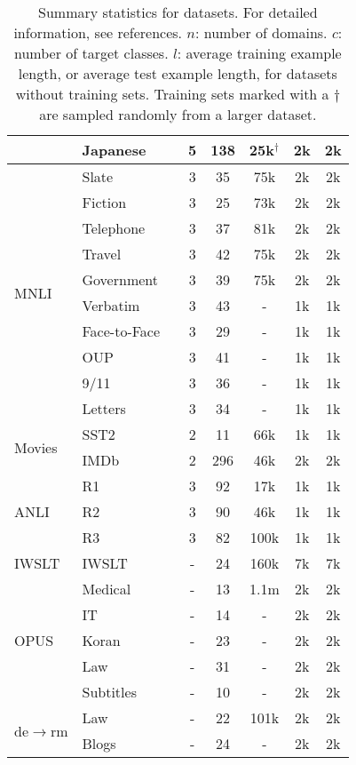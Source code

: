 \begin{table*}[t]
\begin{tabular}{llcccccc}
& Japanese & \citealt{yelp} & 5 & 138 & 25k$^\dagger$ & 2k & 2k\\
\midrule
\multirow{10}{*}{MNLI}
& Slate & \citealt{williams2018broad} & 3 & 35 & 75k & 2k & 2k \\
& Fiction & \citealt{williams2018broad} & 3 & 25 & 73k & 2k & 2k \\
& Telephone & \citealt{williams2018broad} & 3 & 37 & 81k & 2k & 2k \\
& Travel & \citealt{williams2018broad} & 3 & 42 & 75k& 2k & 2k  \\
& Government & \citealt{williams2018broad} & 3 & 39 & 75k & 2k & 2k  \\
& Verbatim & \citealt{williams2018broad} & 3 & 43 & - & 1k & 1k \\
& Face-to-Face & \citealt{williams2018broad} & 3 & 29 & - & 1k & 1k \\
& OUP & \citealt{williams2018broad} & 3 & 41 & - & 1k & 1k \\
& 9/11 & \citealt{williams2018broad} & 3 & 36 & - & 1k & 1k \\
& Letters & \citealt{williams2018broad} & 3 & 34 & - & 1k & 1k \\
\midrule
\multirow{2}{*}{Movies}
& SST2 & \citealt{socher2013recursive} & 2 & 11 & 66k & 1k & 1k\\
& IMDb & \citealt{maas2011learning} & 2 & 296 & 46k & 2k & 2k\\
\midrule
\multirow{3}{*}{ANLI}
& R1 & \citealt{nie2019adversarial} & 3 & 92 & 17k & 1k & 1k \\
& R2 & \citealt{nie2019adversarial} & 3 & 90 & 46k & 1k & 1k \\
& R3 & \citealt{nie2019adversarial} & 3 & 82 & 100k & 1k & 1k \\
\midrule
IWSLT & IWSLT & \citealt{cettolo2014proceedings} & - & 24 & 160k & 7k & 7k \\
\midrule
\multirow{5}{*}{OPUS}
& Medical & \citealt{TIEDEMANN12.463} & - & 13 & 1.1m & 2k & 2k\\
& IT & \citealt{TIEDEMANN12.463} & - & 14 & - & 2k & 2k\\
& Koran & \citealt{TIEDEMANN12.463} & - & 23 & - & 2k & 2k\\
& Law & \citealt{TIEDEMANN12.463} & - & 31 & - & 2k & 2k\\
& Subtitles & \citealt{TIEDEMANN12.463} & - & 10 & - & 2k & 2k\\
\midrule
\multirow{2}{*}{de$\to$rm}
& Law & \citealt{scherrer-cartoni-2012-trilingual} & - & 22 & 101k & 2k & 2k \\
& Blogs & \citealt{Muller2019DomainRI} & - & 24 & - & 2k & 2k \\
\bottomrule
\end{tabular}
\caption{Summary statistics for datasets. For detailed information, see references. $n$: number of domains. $c$: number of target classes. $l$: average training example length, or average test example length, for datasets without training sets. Training sets marked with a $\dagger$ are sampled randomly from a larger dataset.}
\label{tab:data_summ_big}
\end{table*}

